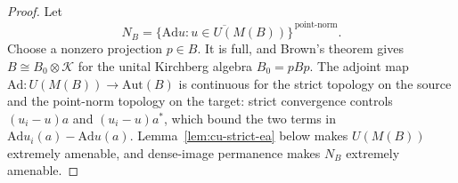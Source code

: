 \begin{proof}
Let 
\begin{equation*}
N_B=\overline{\{\mathrm{Ad} u:u\in U(M(B))\}}^{\,\text{point-norm}}.
\end{equation*}
Choose a nonzero projection $p\in B$. It is full, and Brown's theorem \cite[Theorem 2.8]{Brown1977} gives $B\cong B_0\otimes\mathcal{K}$ for the unital
Kirchberg algebra $B_0=pBp$. The adjoint map $\mathrm{Ad}\colon U(M(B))\to \mathrm{Aut}(B)$ is continuous for the strict topology on the source and the
point-norm topology on the target: strict convergence controls $(u_i-u)a$
and $(u_i-u)a^*$, which bound the two terms in $\mathrm{Ad} u_i(a)-\mathrm{Ad} u(a)$. Lemma~\ref{lem:cu-strict-ea} below makes $U(M(B))$ extremely amenable,
and dense-image permanence makes $N_B$ extremely amenable.


\end{proof}
